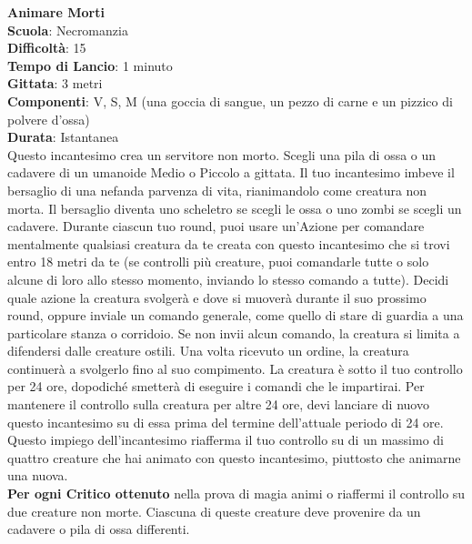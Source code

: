 \begin{multicols}{2}
\medskip\textbf{Animare Morti}\\
\textbf{Scuola}: Necromanzia\\
\textbf{Difficoltà}: 15\\
\textbf{Tempo di Lancio}: 1 minuto\\
\textbf{Gittata}: 3 metri\\
\textbf{Componenti}: V, S, M (una goccia di sangue, un pezzo di carne e un pizzico di polvere d'ossa)\\
\textbf{Durata}: Istantanea\\
Questo incantesimo crea un servitore non morto. Scegli una pila di ossa o un cadavere di un umanoide Medio o Piccolo a gittata. Il tuo incantesimo imbeve il bersaglio di una nefanda parvenza di vita, rianimandolo come creatura non morta. Il bersaglio diventa uno scheletro se scegli le ossa o uno zombi se scegli un cadavere. Durante ciascun tuo round, puoi usare un'Azione per comandare mentalmente qualsiasi creatura da te creata con questo incantesimo che si trovi entro 18 metri da te (se controlli più creature, puoi comandarle tutte o solo alcune di loro allo stesso momento, inviando lo stesso comando a tutte). Decidi quale azione la creatura svolgerà e dove si muoverà durante il suo prossimo round, oppure inviale un comando generale, come quello di stare di guardia a una particolare stanza o corridoio. Se non invii alcun comando, la creatura si limita a difendersi dalle creature ostili. Una volta ricevuto un ordine, la creatura continuerà a svolgerlo fino al suo compimento. La creatura è sotto il tuo controllo per 24 ore, dopodiché smetterà di eseguire i comandi che le impartirai. Per mantenere il controllo sulla creatura per altre 24 ore, devi lanciare di nuovo questo incantesimo su di essa prima del termine dell'attuale periodo di 24 ore. Questo impiego dell'incantesimo riafferma il tuo controllo su di un massimo di quattro creature che hai animato con questo incantesimo, piuttosto che animarne una nuova.\\
\textbf{Per ogni Critico ottenuto} nella prova di magia animi o riaffermi il controllo su due creature non morte. Ciascuna di queste creature deve provenire da un cadavere o pila di ossa differenti.


\end{multicols}
